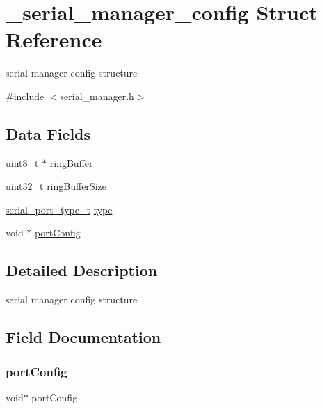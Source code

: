 \hypertarget{struct__serial__manager__config}{}\section{\+\_\+serial\+\_\+manager\+\_\+config Struct Reference}
\label{struct__serial__manager__config}


serial manager config structure  




{\ttfamily \#include $<$serial\+\_\+manager.\+h$>$}

\subsection*{Data Fields}
\begin{DoxyCompactItemize}
\item 
uint8\+\_\+t $\ast$ \mbox{\hyperlink{struct__serial__manager__config_a5aad89b7fedb6b6bb7b67a2f200517e4}{ring\+Buffer}}
\item 
uint32\+\_\+t \mbox{\hyperlink{struct__serial__manager__config_a6091a0a1e610e8c014fc4b070392fc08}{ring\+Buffer\+Size}}
\item 
\mbox{\hyperlink{group__serialmanager_gaa7dc5f93aacda72d14bb0fa66b0401f3}{serial\+\_\+port\+\_\+type\+\_\+t}} \mbox{\hyperlink{struct__serial__manager__config_a03112637c9c98af9974c331c761283a5}{type}}
\item 
void $\ast$ \mbox{\hyperlink{struct__serial__manager__config_a63fdd311bd5f937e94beea458e022ec5}{port\+Config}}
\end{DoxyCompactItemize}


\subsection{Detailed Description}
serial manager config structure 

\subsection{Field Documentation}
\mbox{\label{struct__serial__manager__config_a63fdd311bd5f937e94beea458e022ec5}} 
\subsubsection{\texorpdfstring{portConfig}{portConfig}}
{\footnotesize\ttfamily void$\ast$ port\+Config}

